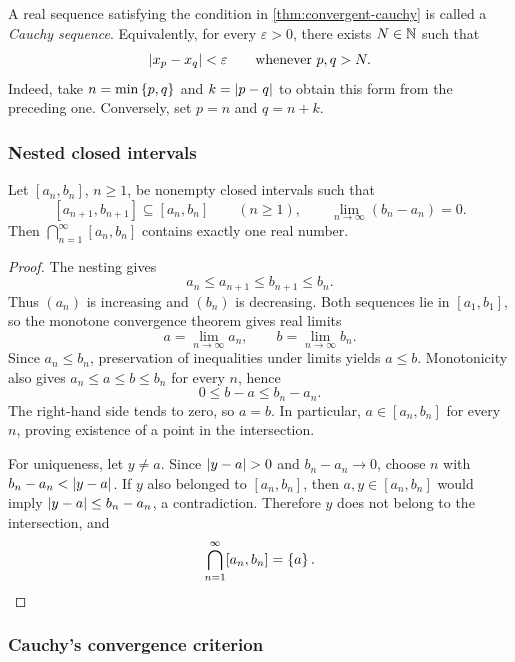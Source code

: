 \documentclass[11pt,a4paper]{amsart}
\begin{document}
\begin{definition}
  A real sequence satisfying the condition in
  \cref{thm:convergent-cauchy} is called a \emph{Cauchy sequence}.
  Equivalently, for every \(\varepsilon>0\), there exists \(N\in\mathbb{N}\)
  such that
  \[
    \lvert x_p-x_q\rvert<\varepsilon\qquad\text{whenever }p,q>N.
  \]
  Indeed, take \(n=\min\left\lbrace p,q\right\rbrace\) and \(k=\lvert p-q\rvert\) to obtain
  this form from the preceding one. Conversely, set \(p=n\) and
  \(q=n+k\).
\end{definition}

\subsubsection{Nested closed intervals}

\begin{lemma}\label{lem:nested-intervals}
  Let \([a_n,b_n]\), \(n\geq1\), be nonempty closed intervals such that
  \[
    [a_{n+1},b_{n+1}]\subseteq[a_n,b_n]\qquad(n\geq1),
    \qquad \lim_{n\to\infty}(b_n-a_n)=0.
  \]
  Then \(\bigcap_{n=1}^{\infty}[a_n,b_n]\) contains exactly one
  real number.
\end{lemma}

\begin{proof}
  The nesting gives
  \[
    a_n\leq a_{n+1}\leq b_{n+1}\leq b_n.
  \]
  Thus \((a_n)\) is increasing and \((b_n)\) is decreasing. Both
  sequences lie in \([a_1,b_1]\), so the monotone convergence theorem
  gives real limits
  \[
    a=\lim_{n\to\infty}a_n,
    \qquad b=\lim_{n\to\infty}b_n.
  \]
  Since \(a_n\leq b_n\), preservation of inequalities under limits
  yields \(a\leq b\). Monotonicity also gives
  \(a_n\leq a\leq b\leq b_n\) for every \(n\), hence
  \[
    0\leq b-a\leq b_n-a_n.
  \]
  The right-hand side tends to zero, so \(a=b\). In particular,
  \(a\in[a_n,b_n]\) for every \(n\), proving existence of a point
  in the intersection.

  For uniqueness, let \(y\neq a\). Since \(\lvert y-a\rvert>0\) and
  \(b_n-a_n\to0\), choose \(n\) with
  \(b_n-a_n<\lvert y-a\rvert\). If \(y\) also belonged to \([a_n,b_n]\),
  then \(a,y\in[a_n,b_n]\) would imply
  \(\lvert y-a\rvert\leq b_n-a_n\), a contradiction. Therefore \(y\)
  does not belong to the intersection, and
  \[
    \bigcap_{n=1}^{\infty}[a_n,b_n]=\left\lbrace a\right\rbrace.
  \]
\end{proof}

\subsubsection{Cauchy's convergence criterion}
\end{document}
